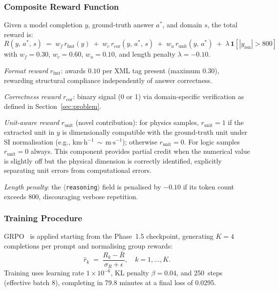 \documentclass{ieeeaccess}
\begin{document}
\subsubsection{Composite Reward Function}

Given a model completion $y$, ground-truth answer $a^*$, and domain
$s$, the total reward is:
\begin{equation}
  R(y,\,a^*,\,s) \;=\;
    w_f\,r_{\text{fmt}}(y)
  \;+\; w_c\,r_{\text{cor}}(y,\,a^*,\,s)
  \;+\; w_u\,r_{\text{unit}}(y,\,a^*)
  \;+\; \lambda\,\mathbf{1}\!\left[|y_{\mathrm{rsn}}| > 800\right]
  \label{eq:reward}
\end{equation}
with $w_f=0.30$, $w_c=0.60$, $w_u=0.10$, and length penalty
$\lambda=-0.10$.

\emph{Format reward} $r_{\text{fmt}}$: awards $0.10$ per XML tag present
(maximum $0.30$), rewarding structural compliance independently of
answer correctness.

\emph{Correctness reward} $r_{\text{cor}}$: binary signal (0 or 1) via
domain-specific verification as defined in Section~\ref{sec:problem}.

\emph{Unit-aware reward} $r_{\text{unit}}$ (novel contribution):
for physics samples, $r_{\text{unit}}=1$ if the extracted unit in $y$
is dimensionally compatible with the ground-truth unit under SI
normalisation (e.g., km$\cdot$h$^{-1}\,\sim\,$m$\cdot$s$^{-1}$);
otherwise $r_{\text{unit}}=0$.
For logic samples $r_{\text{unit}}=0$ always.
This component provides partial credit when the numerical value is
slightly off but the physical dimension is correctly identified,
explicitly separating unit errors from computational errors.

\emph{Length penalty}: the $\langle$\texttt{reasoning}$\rangle$ field
is penalised by $-0.10$ if its token count exceeds 800, discouraging
verbose repetition.

\subsubsection{Training Procedure}

GRPO~\cite{b4} is applied starting from the Phase~1.5 checkpoint,
generating $K=4$ completions per prompt and normalising group rewards:
\begin{equation}
  \hat{r}_k \;=\;
  \frac{R_k - \bar{R}}{\sigma_R + \epsilon},
  \quad k = 1,\ldots,K.
  \label{eq:grponorm}
\end{equation}
Training uses learning rate $1\times10^{-6}$, KL penalty $\beta=0.04$,
and 250~steps (effective batch 8), completing in 79.8 minutes at a
final loss of 0.0295.
\end{document}
